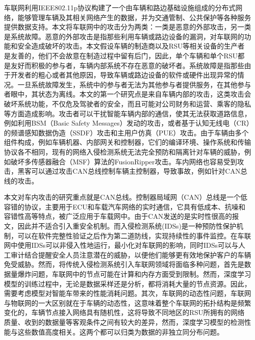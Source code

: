 车联网利用IEEE802.11p协议构建了一个由车辆和路边基础设施组成的分布式网络，能够管理车辆及其相关网络产生的数据，并为交通管制、公共保护等各种服务提供数据支持\cite{ref5,Data_communication_in_VANETs}。本文将车联网中的攻击分为两类：一类是恶意的外部攻击，另一类是系统故障。恶意的外部攻击是指那些利用车辆或路边设备的漏洞，对车联网的功能和安全造成破坏的攻击。本文假设车辆的制造商以及RSU等相关设备的生产者是友善的，他们不会故意在制造过程中留有后门，因此，单个车辆和单个RSU都是友好而积极的参与者，车辆内部系统不存在恶意的破坏者。系统故障是指那些由于开发者的粗心或者其他原因，导致车辆或路边设备的软件或硬件出现异常的情况。一旦系统故障发生，系统中的参与者无法为其他参与者提供服务，在其他参与者眼中，其状态为离线。本文的第一个研究点是来自车辆内部的攻击，这类攻击会破坏系统功能，不仅危及驾驶者的安全，而且可能对公司财务和运营、乘客的隐私等方面造成影响\cite{ref6}。攻击者可以干扰智能车辆内部的通信，使其无法获取道路信息，例如利用BSM（Basic Safety Messages）发动的攻击\cite{Message_Sieving_to_Mitigate_Smart_Gridlock_Attacks_in_V2V}，或者基于认知无线电（CR）的频谱感知数据伪造（SSDF）攻击和主用户仿真（PUE）攻击\cite{Defense_against_SSDF_Attack_and_PUE_Attack_in_CR-Internet_of_Vehicles_(IoVs)_for_Millimeter_Wave_Massive_MIMO_Beamforming_Systems}。由于车辆由多个组件构成，例如车辆机器、内部网关和控制器，它们的编译环境、操作系统和传输协议各不相同，现有的网络入侵检测系统无法完全预防和隔离针对车辆的威胁\cite{CANintelliIDS_Detecting_In-Vehicle_Intrusion_Attacks_on_a_Controller_Area_Network_Using_CNN_and_Attention-Based_GRU}，例如破坏多传感器融合（MSF）算法的FusionRipper攻击\cite{Drift_with_Devil_Security_of_Multi-Sensor_Fusion_based_Localization_in_High-Level_Autonomous_Driving_under_GPS_Spoofing}。车内网络也容易受到攻击，黑客可以通过攻击CAN总线控制车辆主控制器，导致事故，例如针对CAN总线的攻击\cite{Cloaking_the_Clock_Emulating_Clock_Skew_in_Controller_Area_Networks,A_Survey_on_Controller_Area_Network_Reverse_Engineering,Implementation_of_a_bluetooth_attack_on_controller_area_network_CAN}。

本文对车内攻击的研究重点就是CAN总线。控制器局域网（CAN）总线是一个低容错的协议，主要用于ECU和车载汽车网络的实时通信\cite{Intrusion_Detection_System_CAN-Bus_In_Vehicle_Networks_Based_on_the_Statistical_Characteristics_of_Attacks}，它具有低成本、抗噪和容错性高等特点，被广泛应用于车载网中。由于CAN发送的是实时性很高的报文，因此并不适合引入重安全机制。而入侵检测系统(IDSs)是一种预防性保护机制，可以在软件完整性验证\cite{ref9}之后作为第二道防线，实现持续性的事件监控\cite{ref10}。在车联网中使用IDSs可以非侵入性地运行，最小化对车联网的影响，同时IDSs可以与人工审计结合提醒安全人员注意潜在的威胁，以便他们能够更有效地保护客户的车辆免受威胁\cite{ref11}。然而，将传统入侵检测系统引入车联网领域将面临多种问题，首先是数据量爆炸问题，车联网中的节点可能在计算和内存方面受到限制。然而，深度学习模型的训练过程中，无论是数据采样还是分析，都将消耗大量的节点资源。因此，需要考虑模型对智能车带来的性能消耗问题。其次，车联网的动态性问题，车联网与物联网的一大区别就在于车辆的动态性，这意味着整个车联网的拓扑结构是频繁变化的，车辆节点接入网络具有随机性\cite{Attack_IOV2}，这将导致不同地区的RSU所拥有的网络质量、收到的数据量等客观条件之间有较大的差异，然而，深度学习模型的检测性能与这些数值高度相关。这两个都可以归类为数据的非独立同分布问题。

